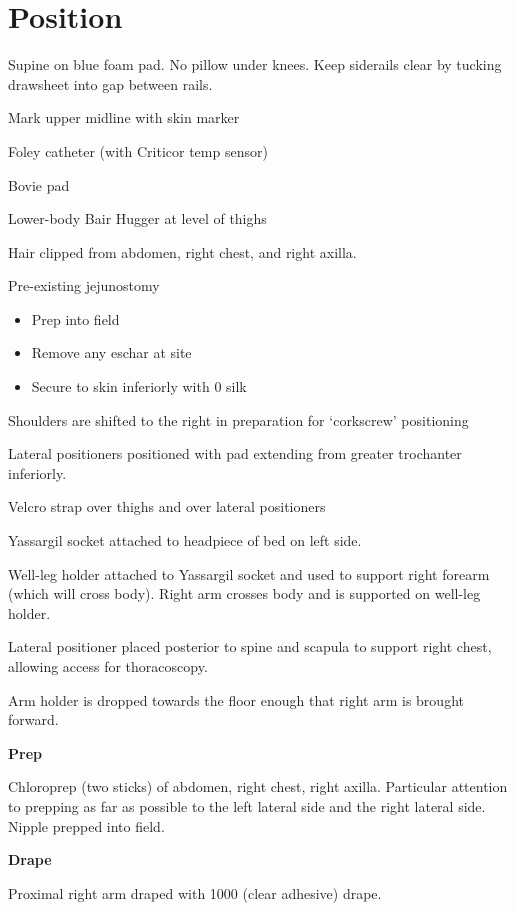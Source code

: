 \documentclass[
  letterpaper,
]{scrbook}
\providecommand{\tightlist}{%
  \setlength{\itemsep}{0pt}\setlength{\parskip}{0pt}}
\begin{document}
\section{Position}\label{position}

Supine on blue foam pad. No pillow under knees. Keep siderails clear by
tucking drawsheet into gap between rails.

Mark upper midline with skin marker

Foley catheter (with Criticor temp sensor)

Bovie pad

Lower-body Bair Hugger at level of thighs

Hair clipped from abdomen, right chest, and right axilla.

Pre-existing jejunostomy

\begin{itemize}
\tightlist
\item
  Prep into field
\item
  Remove any eschar at site
\item
  Secure to skin inferiorly with 0 silk
\end{itemize}

Shoulders are shifted to the right in preparation for `corkscrew'
positioning

Lateral positioners positioned with pad extending from greater
trochanter inferiorly.

Velcro strap over thighs and over lateral positioners

Yassargil socket attached to headpiece of bed on left side.

Well-leg holder attached to Yassargil socket and used to support right
forearm (which will cross body). Right arm crosses body and is supported
on well-leg holder.

Lateral positioner placed posterior to spine and scapula to support
right chest, allowing access for thoracoscopy.

Arm holder is dropped towards the floor enough that right arm is brought
forward.

\textbf{Prep}

Chloroprep (two sticks) of abdomen, right chest, right axilla.
Particular attention to prepping as far as possible to the left lateral
side and the right lateral side. Nipple prepped into field.

\textbf{Drape}

Proximal right arm draped with 1000 (clear adhesive) drape.
\end{document}
